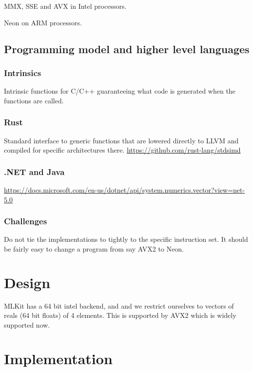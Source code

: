 \documentclass{article}
\begin{document}
MMX, SSE and AVX in Intel processors.

Neon on ARM processors.

\subsection{Programming model and higher level languages}

\subsubsection{Intrinsics}

Intrinsic functions for C/C++ guaranteeing what code is generated when the functions are called.

\subsubsection{Rust}

Standard interface to generic functions that are lowered directly to LLVM and compiled for specific architectures there.
\url{https://github.com/rust-lang/stdsimd}

\subsubsection{.NET and Java}

\url{https://docs.microsoft.com/en-us/dotnet/api/system.numerics.vector?view=net-5.0}


\subsubsection{Challenges}

Do not tie the implementations to tightly to the specific instruction set. It should be fairly easy to change a program from say AVX2 to Neon.

\section{Design}

MLKit has a 64 bit intel backend, and and we restrict ourselves to vectors of reals (64 bit floats) of 4 elements. This is supported by AVX2 which is widely supported now.

\section{Implementation}
\end{document}
